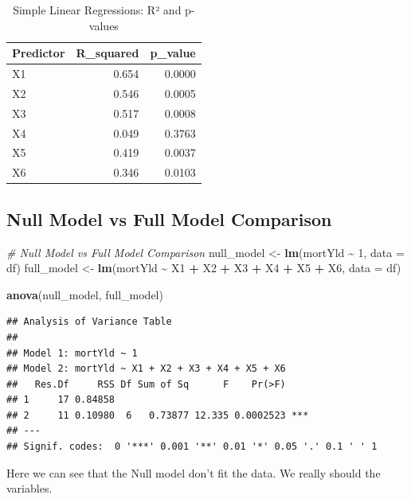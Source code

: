 \documentclass[
  12pt,
]{article}
\newenvironment{Shaded}{\begin{snugshade}}{\end{snugshade}}
\newcommand{\AttributeTok}[1]{\textcolor[rgb]{0.13,0.29,0.53}{#1}}
\newcommand{\CommentTok}[1]{\textcolor[rgb]{0.56,0.35,0.01}{\textit{#1}}}
\newcommand{\DecValTok}[1]{\textcolor[rgb]{0.00,0.00,0.81}{#1}}
\newcommand{\FunctionTok}[1]{\textcolor[rgb]{0.13,0.29,0.53}{\textbf{#1}}}
\newcommand{\NormalTok}[1]{#1}
\newcommand{\OtherTok}[1]{\textcolor[rgb]{0.56,0.35,0.01}{#1}}
\newcommand{\SpecialCharTok}[1]{\textcolor[rgb]{0.81,0.36,0.00}{\textbf{#1}}}
\begin{document}
\begin{longtable}[t]{lrr}
\caption{\label{tab:unnamed-chunk-10}Simple Linear Regressions: R² and p-values}\\
\toprule
Predictor & R\_squared & p\_value\\
\midrule
X1 & 0.654 & 0.0000\\
X2 & 0.546 & 0.0005\\
X3 & 0.517 & 0.0008\\
X4 & 0.049 & 0.3763\\
X5 & 0.419 & 0.0037\\
\addlinespace
X6 & 0.346 & 0.0103\\
\bottomrule
\end{longtable}

\subsection{Null Model vs Full Model
Comparison}\label{null-model-vs-full-model-comparison}

\begin{Shaded}
\begin{Highlighting}[]
\CommentTok{\# Null Model vs Full Model Comparison}
\NormalTok{null\_model }\OtherTok{\textless{}{-}} \FunctionTok{lm}\NormalTok{(mortYld }\SpecialCharTok{\textasciitilde{}} \DecValTok{1}\NormalTok{, }\AttributeTok{data =}\NormalTok{ df)}
\NormalTok{full\_model }\OtherTok{\textless{}{-}} \FunctionTok{lm}\NormalTok{(mortYld }\SpecialCharTok{\textasciitilde{}}\NormalTok{ X1 }\SpecialCharTok{+}\NormalTok{ X2 }\SpecialCharTok{+}\NormalTok{ X3 }\SpecialCharTok{+}\NormalTok{ X4 }\SpecialCharTok{+}\NormalTok{ X5 }\SpecialCharTok{+}\NormalTok{ X6, }\AttributeTok{data =}\NormalTok{ df)}

\FunctionTok{anova}\NormalTok{(null\_model, full\_model)}
\end{Highlighting}
\end{Shaded}

\begin{verbatim}
## Analysis of Variance Table
## 
## Model 1: mortYld ~ 1
## Model 2: mortYld ~ X1 + X2 + X3 + X4 + X5 + X6
##   Res.Df     RSS Df Sum of Sq      F    Pr(>F)    
## 1     17 0.84858                                  
## 2     11 0.10980  6   0.73877 12.335 0.0002523 ***
## ---
## Signif. codes:  0 '***' 0.001 '**' 0.01 '*' 0.05 '.' 0.1 ' ' 1
\end{verbatim}

Here we can see that the Null model don't fit the data. We really should
the variables.
\end{document}
